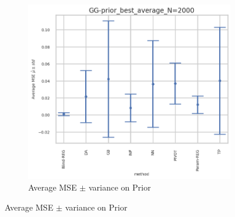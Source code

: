 \begin{figure}[ht!]
\begin{subfigure}[t]{0.49\linewidth}
    \includegraphics[width=\linewidth]{COMPARE/GG-prior/BEST_MSE/GG-prior_best_average_N=2000-errplot_mse.png}
    \caption{Average MSE $\pm$ variance on Prior}
  \end{subfigure}


\end{figure}
